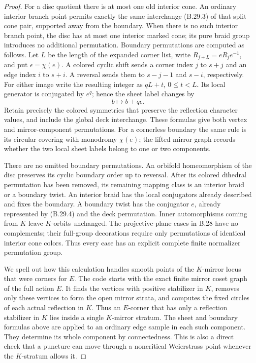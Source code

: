 \begin{proof}
For a disc quotient there is at most one old interior cone.
An ordinary interior branch point permits exactly the same
interchange (B.29.3) of that split cone pair, supported away from
the boundary.  When there is no such interior branch point, the
disc has at most one interior marked cone; its pure braid group
introduces no additional permutation.  Boundary permutations are
computed as follows.  Let $L$ be the length of the expanded corner
list, write $R_{j+L}=eR_je^{-1}$, and put
$\epsilon=\chi(e)$.  A colored cyclic shift sends a corner index
$j$ to $s+j$ and an edge index $i$ to $s+i$.
A reversal sends them to $s-j-1$ and $s-i$, respectively.
For either image write the resulting integer as $qL+t$,
$0\le t<L$.  Its local generator is conjugated by $e^q$;
hence the sheet label changes by
\[
                          b\longmapsto b+q\epsilon.   \tag{B.29.4}
\]
Retain precisely the colored symmetries that preserve the reflection
character values, and include the global deck interchange.
These formulas give both vertex and mirror-component permutations.
For a cornerless boundary the same rule is its circular covering
with monodromy $\chi(e)$; the lifted mirror graph records whether
the two local sheet labels belong to one or two components.

There are no omitted boundary permutations.  An orbifold
homeomorphism of the disc preserves its cyclic boundary order
up to reversal.  After its colored dihedral permutation has been
removed, its remaining mapping class is an interior braid or a
boundary twist.  An interior braid has the local conjugators
already described and fixes the boundary.  A boundary twist has
the conjugator $e$, already represented by (B.29.4) and the deck
permutation.  Inner automorphisms coming from $K$ leave $K$-orbits
unchanged.  The projective-plane cases in B.28 have no complements;
their full-group decorations require only permutations of identical
interior cone colors.  Thus every case has an explicit complete
finite normalizer permutation group.

We spell out how this calculation handles smooth points of the
$K$-mirror locus that were corners for $E$.  The code starts with
the exact finite mirror coset graph of the full action $E$.
It finds the vertices with positive stabilizer in $K$, removes
only these vertices to form the open mirror strata, and computes
the fixed circles of each actual reflection in $K$.
Thus an $E$-corner that has only a reflection stabilizer in $K$
lies inside a single $K$-mirror stratum.  The sheet and boundary
formulas above are applied to an ordinary edge sample in each
such component.  They determine its whole component by
connectedness.  This is also a direct check that a puncture can
move through a noncritical Weierstrass point whenever the
$K$-stratum allows it.


\end{proof}
